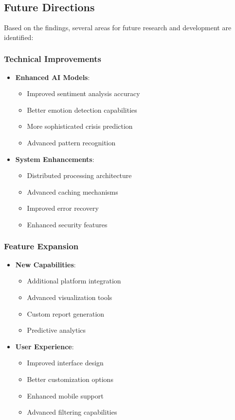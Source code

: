 \subsection{Future Directions}
Based on the findings, several areas for future research and development are identified:

\subsubsection{Technical Improvements}
\begin{itemize}
    \item \textbf{Enhanced AI Models}:
    \begin{itemize}
        \item Improved sentiment analysis accuracy
        \item Better emotion detection capabilities
        \item More sophisticated crisis prediction
        \item Advanced pattern recognition
    \end{itemize}
    \item \textbf{System Enhancements}:
    \begin{itemize}
        \item Distributed processing architecture
        \item Advanced caching mechanisms
        \item Improved error recovery
        \item Enhanced security features
    \end{itemize}
\end{itemize}

\subsubsection{Feature Expansion}
\begin{itemize}
    \item \textbf{New Capabilities}:
    \begin{itemize}
        \item Additional platform integration
        \item Advanced visualization tools
        \item Custom report generation
        \item Predictive analytics
    \end{itemize}
    \item \textbf{User Experience}:
    \begin{itemize}
        \item Improved interface design
        \item Better customization options
        \item Enhanced mobile support
        \item Advanced filtering capabilities
    \end{itemize}
\end{itemize}

